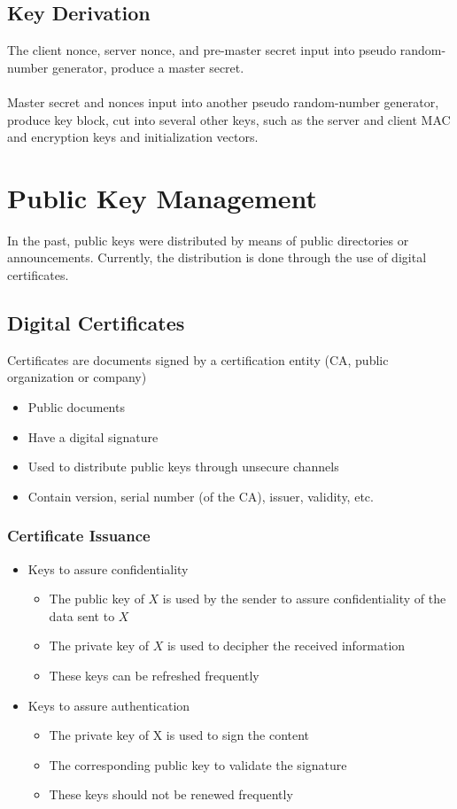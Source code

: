 \documentclass[10pt,a4paper]{report}
\begin{document}
\subsection{Key Derivation}
The client nonce, server nonce, and pre-master secret input into pseudo random-number generator, produce a master secret.\\
\\
Master secret and nonces input into another pseudo
random-number generator, produce key block, cut into several other keys, such as the server and client MAC and encryption keys and initialization vectors.
\section{Public Key Management}
In the past, public keys were distributed by means of public directories or announcements. Currently, the distribution is done through the use of digital certificates.
\subsection{Digital Certificates}
Certificates are documents signed by a certification entity (CA, public organization or company)
\begin{itemize}
\item Public documents
\item Have a digital signature
\item Used to distribute public keys through unsecure channels
\item Contain version, serial number (of the CA), issuer, validity, etc.
\end{itemize}
\subsubsection{Certificate Issuance}
\begin{itemize}
\item Keys to assure confidentiality
\begin{itemize}
\item The public key of $X$ is used by the sender to assure confidentiality of the data sent to $X$
\item The private key of $X$ is used to decipher the received information
\item These keys can be refreshed frequently
\end{itemize}
\item Keys to assure authentication
\begin{itemize}
\item The private key of X is used to sign the content
\item The corresponding public key to validate the signature
\item These keys should not be renewed frequently
\end{itemize}
\end{itemize}
\end{document}
